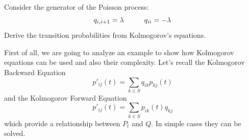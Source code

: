 \documentclass{article}
\begin{document}
	\begin{exercise}
		Consider the generator of the Poisson process:
		\begin{equation*}
			q_{i,i+1}=\lambda \hspace{1 cm} q_{ii} = - \lambda
		\end{equation*}
		Derive the transition probabilities from Kolmogorov's equations.  
	\end{exercise}
	First of all, we are going to analyze an example to show how Kolmogorov equations can be used and also their complexity. Let's recall the Kolmogorov Backward Equation
	\begin{equation*}
		p'_{ij}(t) = \sum_{k \in S} q_{ik}p_{kj}(t)
	\end{equation*}
	and the Kolmogorov Forward Equation
	\begin{equation*}
		p'_{ij}(t) = \sum_{k \in S} p_{ik}(t) q_{kj}
	\end{equation*}
	which provide a relationship between $P_t$ and $Q$. In simple cases they can be solved. 
\end{document}
